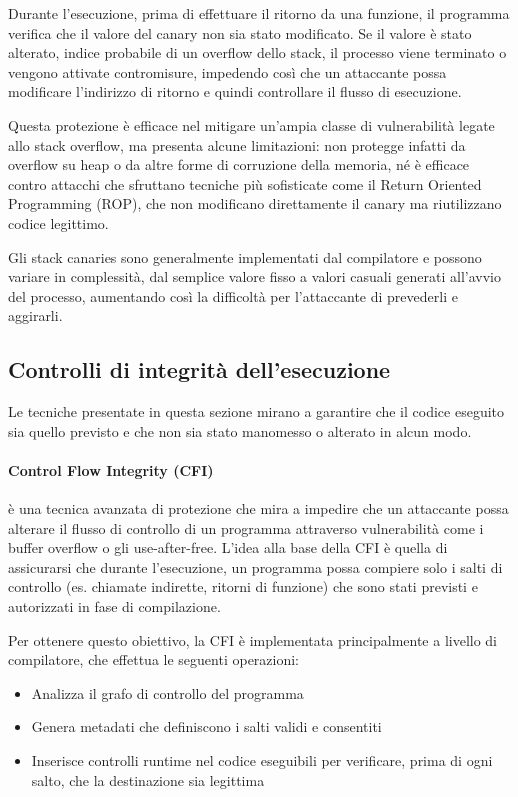 Durante l'esecuzione, prima di effettuare il ritorno da una funzione, il programma
verifica che il valore del canary non sia stato modificato. Se il valore è stato
alterato, indice probabile di un overflow dello stack, il processo viene
terminato o vengono attivate contromisure, impedendo così che un attaccante possa
modificare l'indirizzo di ritorno e quindi controllare il flusso di esecuzione.

Questa protezione è efficace nel mitigare un'ampia classe di vulnerabilità legate
allo stack overflow, ma presenta alcune limitazioni: non protegge infatti da overflow
su heap o da altre forme di corruzione della memoria, né è efficace contro
attacchi che sfruttano tecniche più sofisticate come il Return Oriented
Programming (ROP), che non modificano direttamente il canary ma riutilizzano codice
legittimo.

Gli stack canaries sono generalmente implementati dal compilatore e possono variare
in complessità, dal semplice valore fisso a valori casuali generati all'avvio
del processo, aumentando così la difficoltà per l'attaccante di prevederli e aggirarli.

\subsection{Controlli di integrità dell'esecuzione}
\label{sec:execution-integrity} Le tecniche presentate in questa sezione mirano a
garantire che il codice eseguito sia quello previsto e che non sia stato manomesso
o alterato in alcun modo.

\paragraph{Control Flow Integrity (CFI)}
è una tecnica avanzata di protezione che mira a impedire che un attaccante possa
alterare il flusso di controllo di un programma attraverso vulnerabilità come i
buffer overflow o gli use-after-free. L'idea alla base della CFI è quella di assicurarsi
che durante l'esecuzione, un programma possa compiere solo i salti di controllo
(es. chiamate indirette, ritorni di funzione) che sono stati previsti e
autorizzati in fase di compilazione.

Per ottenere questo obiettivo, la CFI è implementata principalmente a livello di
compilatore, che effettua le seguenti operazioni:
\begin{itemize}
  \item Analizza il grafo di controllo del programma

  \item Genera metadati che definiscono i salti validi e consentiti

  \item Inserisce controlli runtime nel codice eseguibili per verificare, prima
    di ogni salto, che la destinazione sia legittima
\end{itemize}

